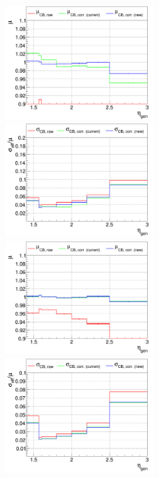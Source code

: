 \begin{figure}
\includegraphics[width=0.495\textwidth]{./plots_pdf/ECAL_plots/plotsNoPU/EE/pdf/FULL/GENETA/EEFULL_GENETA_0005_0020_MuOverBins.pdf}
\includegraphics[width=0.495\textwidth]{./plots_pdf/ECAL_plots/plotsNoPU/EE/pdf/FULL/GENETA/EEFULL_GENETA_0005_0020_EffSigmaOverBins.pdf}
\includegraphics[width=0.495\textwidth]{./plots_pdf/ECAL_plots/plotsNoPU/EE/pdf/FULL/GENETA/EEFULL_GENETA_0020_0100_MuOverBins.pdf}
\includegraphics[width=0.495\textwidth]{./plots_pdf/ECAL_plots/plotsNoPU/EE/pdf/FULL/GENETA/EEFULL_GENETA_0020_0100_EffSigmaOverBins.pdf}

\end{figure}
